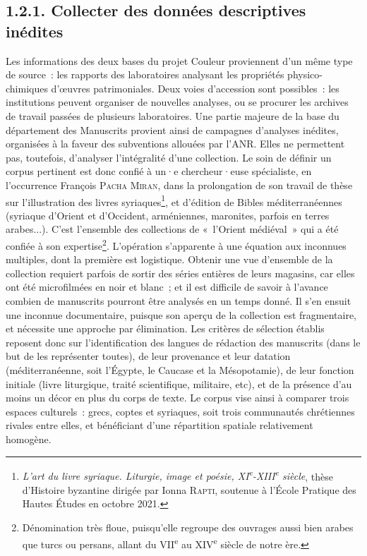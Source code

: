 \documentclass[a4paper,12pt, twoside]{book}
\begin{document}
\subsection*{1.2.1. Collecter des données descriptives inédites}

Les informations des deux bases du projet Couleur proviennent d’un même type de source~: les rapports des laboratoires analysant les propriétés physico-chimiques d’œuvres patrimoniales. Deux voies d’accession sont possibles~: les institutions peuvent organiser de nouvelles analyses, ou se procurer les archives de travail passées de plusieurs laboratoires. Une partie majeure de la base du département des Manuscrits provient ainsi de campagnes d’analyses inédites, organisées à la faveur des subventions allouées par l’ANR. Elles ne permettent pas, toutefois, d’analyser l’intégralité d’une collection. Le soin de définir un corpus pertinent est donc confié à un·e chercheur·euse spécialiste, en l’occurrence François \textsc{Pacha Miran}, dans la prolongation de son travail de thèse sur l’illustration des livres syriaques\footnote{\textit{L'art du livre syriaque. Liturgie, image et poésie, XI\textsuperscript{e}-XIII\textsuperscript{e} siècle}, thèse d’Histoire byzantine dirigée par Ionna \textsc{Rapti}, soutenue à l’École Pratique des Hautes Études en octobre 2021.}, et d’édition de Bibles méditerranéennes (syriaque d’Orient et d’Occident, arméniennes, maronites, parfois en terres arabes...). C’est l’ensemble des collections de «~l’Orient médiéval~» qui a été confiée à son expertise\footnote{Dénomination très floue, puisqu’elle regroupe des ouvrages aussi bien arabes que turcs ou persans, allant du VII\textsuperscript{e} au XIV\textsuperscript{e} siècle de notre ère.}. L’opération s’apparente à une équation aux inconnues multiples, dont la première est logistique. Obtenir une vue d’ensemble de la collection requiert parfois de sortir des séries entières de leurs magasins, car elles ont été microfilmées en noir et blanc~; et il est difficile de savoir à l’avance combien de manuscrits pourront être analysés en un temps donné. Il s’en ensuit une inconnue documentaire, puisque son aperçu de la collection est fragmentaire, et nécessite une approche par élimination. Les critères de sélection établis reposent donc sur l’identification des langues de rédaction des manuscrits (dans le but de les représenter toutes), de leur provenance et leur datation (méditerranéenne, soit l’Égypte, le Caucase et la Mésopotamie), de leur fonction initiale (livre liturgique, traité scientifique, militaire, etc), et de la présence d’au moins un décor en plus du corps de texte. Le corpus vise ainsi à comparer trois espaces culturels~: grecs, coptes et syriaques, soit trois communautés chrétiennes rivales entre elles, et bénéficiant d’une répartition spatiale relativement homogène.
\end{document}
